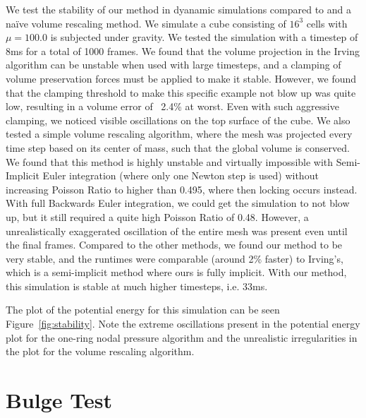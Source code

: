 We test the stability of our method in dyanamic simulations compared to \cite{Irving:2007} and a na\"ive volume rescaling method. We simulate a cube consisting of $16^3$ cells with $\mu = 100.0$ is subjected under gravity. We tested the simulation with a timestep of 8ms for a total of 1000 frames.
We found that the volume projection in the Irving algorithm can be unstable when used with large timesteps, and a clamping of volume preservation forces must be applied to make it stable. However, we found that the clamping threshold to make this specific example not blow up was quite low, resulting in a volume error of ~2.4\% at worst. Even with such aggressive clamping, we noticed visible oscillations on the top surface of the cube.
We also tested a simple volume rescaling algorithm, where the mesh was projected every time step based on its center of mass, such that the global volume is conserved. We found that this method is highly unstable and virtually impossible with Semi-Implicit Euler integration (where only one Newton step is used) without increasing Poisson Ratio to higher than 0.495, where then locking occurs instead. With full Backwards Euler integration, we could get the simulation to not blow up, but it still required a quite high Poisson Ratio of 0.48. However, a unrealistically exaggerated oscillation of the entire mesh was present even until the final frames. 
Compared to the other methods, we found our method to be very stable, and the runtimes were comparable (around 2\% faster) to Irving's, which is a semi-implicit method where ours is fully implicit. With our method, this simulation is stable at much higher timesteps, i.e. 33ms. 


The plot of the potential energy for this simulation can be seen Figure~\ref{fig:stability}. Note the extreme oscillations present in the potential energy plot for the one-ring nodal pressure algorithm \cite{Irving:2007} and the unrealistic irregularities in the plot for the volume rescaling algorithm.


\section{Bulge Test}

